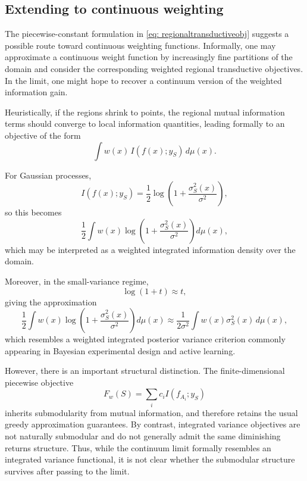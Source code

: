\subsection{Extending to continuous weighting}

The piecewise-constant formulation in \eqref{eq: regionaltransductiveobj} suggests a possible route toward continuous weighting functions. Informally, one may approximate a continuous weight function by increasingly fine partitions of the domain and consider the corresponding weighted regional transductive objectives. In the limit, one might hope to recover a continuum version of the weighted information gain.

Heuristically, if the regions shrink to points, the regional mutual information terms should converge to local information quantities, leading formally to an objective of the form
\begin{equation*}
\int
w(x)\,
I(f(x);y_S)\,
d\mu(x).
\end{equation*}

For Gaussian processes,
\begin{equation*}
I(f(x);y_S)
=
\frac12
\log\!\left(
1+\frac{\sigma_S^2(x)}{\sigma^2}
\right),
\end{equation*}
so this becomes
\begin{equation*}
\frac12
\int
w(x)
\log\!\left(
1+\frac{\sigma_S^2(x)}{\sigma^2}
\right)
d\mu(x),
\end{equation*}
which may be interpreted as a weighted integrated information density over the domain.

Moreover, in the small-variance regime,
\begin{equation*}
\log(1+t)\approx t,
\end{equation*}
giving the approximation
\begin{equation*}
\frac12
\int
w(x)
\log\!\left(
1+\frac{\sigma_S^2(x)}{\sigma^2}
\right)
d\mu(x)
\approx
\frac1{2\sigma^2}
\int
w(x)\sigma_S^2(x)\,d\mu(x),
\end{equation*}
which resembles a weighted integrated posterior variance criterion commonly appearing in Bayesian experimental design and active learning.

However, there is an important structural distinction. The finite-dimensional piecewise objective
\begin{equation*}
F_w(S)
=
\sum_i
c_i I(f_{A_i};y_S)
\end{equation*}
inherits submodularity from mutual information, and therefore retains the usual greedy approximation guarantees. By contrast, integrated variance objectives are not naturally submodular and do not generally admit the same diminishing returns structure.
Thus, while the continuum limit formally resembles an integrated variance functional, it is not clear whether the submodular structure survives after passing to the limit.

